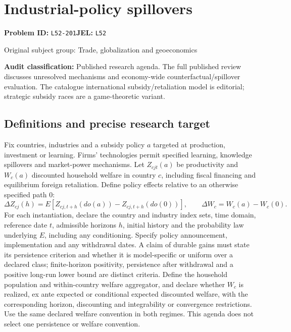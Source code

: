 \documentclass[11pt,a4paper]{article}
\begin{document}
\section*{Industrial-policy spillovers}
\textbf{Problem ID:} \texttt{L52-201}\quad \textbf{JEL:} \texttt{L52}\par
\label{problem:OP-0346}
{\sffamily\small\color{muted}Original subject group: Trade, globalization and geoeconomics\par}
\label{definitions:problem:30007628}
\textbf{Audit classification:} Published research agenda. The full published review discusses unresolved mechanisms and economy-wide counterfactual/spillover evaluation. The catalogue international subsidy/retaliation model is editorial; strategic subsidy races are a game-theoretic variant.
\subsection*{Definitions and precise research target}
Fix countries, industries and a subsidy policy \(a\) targeted at production, investment or learning. Firms' technologies permit specified learning, knowledge spillovers and market-power mechanisms. Let \(Z_{cjt}(a)\) be productivity and \(W_c(a)\) discounted household welfare in country \(c\), including fiscal financing and equilibrium foreign retaliation. Define policy effects relative to an otherwise specified path \(0\):
\[\Delta Z_{cj}(h)=E[Z_{cj,t+h}(do(a))-Z_{cj,t+h}(do(0))],\qquad \Delta W_c=W_c(a)-W_c(0).\]
For each instantiation, declare the country and industry index sets, time domain, reference date \(t\), admissible horizons \(h\), initial history and the probability law underlying \(E\), including any conditioning. Specify policy announcement, implementation and any withdrawal dates. A claim of durable gains must state its persistence criterion and whether it is model-specific or uniform over a declared class; finite-horizon positivity, persistence after withdrawal and a positive long-run lower bound are distinct criteria. Define the household population and within-country welfare aggregator, and declare whether \(W_c\) is realized, ex ante expected or conditional expected discounted welfare, with the corresponding horizon, discounting and integrability or convergence restrictions. Use the same declared welfare convention in both regimes. This agenda does not select one persistence or welfare convention.
\end{document}
